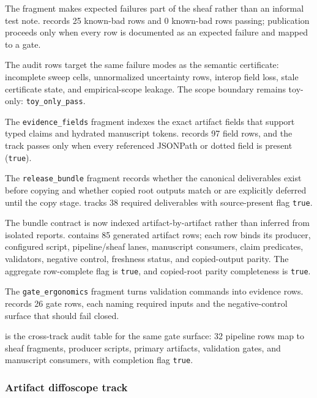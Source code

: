 \documentclass[
  english,
]{article}
\begin{document}
The  fragment makes expected failures part of
the sheaf rather than an informal test note.
 records 25 known-bad
rows and 0 known-bad rows passing; publication proceeds only when every
row is documented as an expected failure and mapped to a gate.

The audit rows target the same failure modes as the semantic
certificate: incomplete sweep cells, unnormalized uncertainty rows,
interop field loss, stale certificate state, and empirical-scope
leakage. The scope boundary remains toy-only: \texttt{toy\_only\_pass}.

The \texttt{evidence\_fields} fragment indexes the exact artifact fields
that support typed claims and hydrated manuscript tokens.
 records 97 field rows,
and the track passes only when every referenced JSONPath or dotted field
is present (\texttt{true}).

The \texttt{release\_bundle} fragment records whether the canonical
deliverables exist before copying and whether copied root outputs match
or are explicitly deferred until the copy stage.
 tracks 38
required deliverables with source-present flag \texttt{true}.

The bundle contract is now indexed artifact-by-artifact rather than
inferred from isolated reports.
 contains 85
generated artifact rows; each row binds its producer, configured script,
pipeline/sheaf lanes, manuscript consumers, claim predicates,
validators, negative control, freshness status, and copied-output
parity. The aggregate row-complete flag is \texttt{true}, and
copied-root parity completeness is \texttt{true}.

The \texttt{gate\_ergonomics} fragment turns validation commands into
evidence rows.  records
26 gate rows, each naming required inputs and the negative-control
surface that should fail closed.

 is the cross-track audit
table for the same gate surface: 32 pipeline rows map to sheaf
fragments, producer scripts, primary artifacts, validation gates, and
manuscript consumers, with completion flag \texttt{true}.

\subsubsection{Artifact diffoscope
track}\label{artifact-diffoscope-track}
\end{document}
